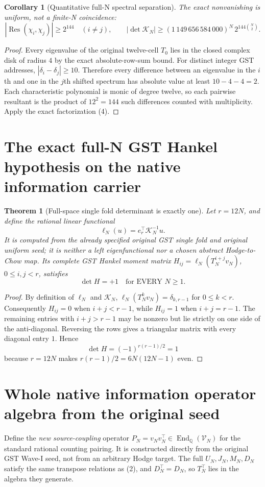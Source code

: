 \documentclass[11pt]{article}
\newtheorem{theorem}{Theorem}
\newtheorem{corollary}{Corollary}
\newcommand{\Q}{\mathbb Q}
\newcommand{\End}{\operatorname{End}}
\newcommand{\Res}{\operatorname{Res}}
\begin{document}
\begin{corollary}[Quantitative full-N spectral separation]
The exact nonvanishing is uniform, not a finite-N coincidence:
\[
 \boxed{
 |\Res(\chi_i,\chi_j)|\ge 2^{144}\quad(i\ne j),\qquad
 |\det\mathcal K_N|\ge
 (1\,149\,656\,584\,000)^N\,
 2^{144\binom N2}.}
\tag{9}
\]
\end{corollary}
\begin{proof}
Every eigenvalue of the original twelve-cell $T_0$ lies in the closed
complex disk of radius $4$ by the exact absolute-row-sum bound.
For distinct integer GST addresses, $|\delta_i-\delta_j|\ge10$.
Therefore every difference between an eigenvalue in the $i$th and
one in the $j$th shifted spectrum has absolute value at least
$10-4-4=2$. Each characteristic polynomial is monic of degree
twelve, so each pairwise resultant is the product of $12^2=144$
such differences counted with multiplicity. Apply the exact
factorization (4).
\end{proof}

\section{The exact full-N GST Hankel hypothesis on the native information carrier}
\begin{theorem}[Full-space single fold determinant is exactly one]
Let $r=12N$, and define the rational linear functional
\[
 \boxed{\ell_N(u)=e_r^\top\mathcal K_N^{-1}u.}\tag{5}
\]
It is computed from the \emph{already specified original} GST single fold and original uniform seed; it is neither a left eigenfunctional nor a chosen abstract Hodge-to-Chow map. Its complete GST Hankel moment matrix
\(H_{ij}=\ell_N(T_N^{i+j}v_N)\), $0\le i,j<r$, satisfies
\[
 \boxed{\det H=+1\quad\text{for EVERY }N\ge1.}\tag{6}
\]
\end{theorem}
\begin{proof}
By definition of $\ell_N$ and $\mathcal K_N$,
\(\ell_N(T_N^k v_N)=\delta_{k,r-1}\) for $0\le k<r$.
Consequently $H_{ij}=0$ when $i+j<r-1$, while $H_{ij}=1$ when $i+j=r-1$. The remaining entries with $i+j>r-1$ may be nonzero but lie strictly on one side of the anti-diagonal. Reversing the rows gives a triangular matrix with every diagonal entry $1$. Hence
\[
 \det H=(-1)^{r(r-1)/2}=1
\]
because $r=12N$ makes $r(r-1)/2=6N(12N-1)$ even.
\end{proof}

\section{Whole native information operator algebra from the original seed}
Define the \emph{new source-coupling} operator
\(P_N=v_Nv_N^\top\in\End_\Q(\mathscr V_N)\)
for the standard rational counting pairing. It is constructed directly from the original GST Wave-I seed, not from an arbitrary Hodge target.
The full $U_N,J_N,M_N,D_N$ satisfy the same transpose relations as (2), and $D_N^\top=D_N$, so $T_N^\top$ lies in the algebra they generate.
\end{document}
